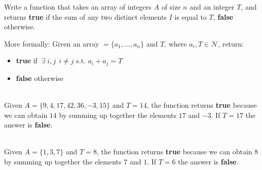 \begin{exercise}
	Write a function that takes an array of integers $A$ of size $n$ and an integer $T$, and returns \textbf{true} if the sum of any two distinct elements $I$ is equal to $T$, \textbf{false} otherwise.

	More formally: Given an array $=\{a_1,...,a_n\}$ and $T$, where $a_i, T \in
	\mathcal{N}$, return:
	\begin{itemize}
		\item  \textbf{true} if $\: \exists \;i,j \:\: i \neq j$ s.t. $a_i+a_j = T$
		\item  \textbf{false} otherwise
	\end{itemize}
	

	\begin{example}
	\hfill \\
		Given $A=\{9, 4, 17, 42, 36, -3 ,15\}$ and $T=14$, the function returns \textbf{true} because we can obtain $14$ by summing
		up together the elements $17$ and $-3$.
		If $T=17$ the answer is \textbf{false}.
	\end{example}

	\begin{example}
	\hfill \\
		Given $A=\{1,3,7\}$ and $T=8$, the function returns \textbf{true} because we can obtain $8$ by summing
		up together the elements $7$ and $1$. If $T=6$ the answer is \textbf{false}.
	\end{example}

\end{exercise}	


